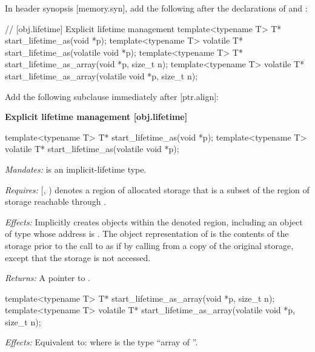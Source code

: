 In header  synopsis [memory.syn], add the following after the declarations of  and :

\begin{adjustwidth}{0.5cm}{0.5cm}

\begin{addedblock}
\begin{codeblock}
// [obj.lifetime] Explicit lifetime management
template<typename T> T* start_lifetime_as(void *p);
template<typename T> volatile T* start_lifetime_as(volatile void *p);
template<typename T> T* start_lifetime_as_array(void *p, size_t n);
template<typename T> volatile T* start_lifetime_as_array(volatile void *p, size_t n);
\end{codeblock}
\end{addedblock}
\end{adjustwidth}

Add the following subclause immediately after [ptr.align]:

\begin{addedblock}
\textbf{Explicit lifetime management \hspace{83mm}[obj.lifetime]}

\begin{codeblock}
template<typename T> T* start_lifetime_as(void *p);
template<typename T> volatile T* start_lifetime_as(volatile void *p);
\end{codeblock}

\begin{adjustwidth}{0.5cm}{0.5cm}
\emph{Mandates:}  is an implicit-lifetime type.

\emph{Requires:} [, ) denotes a region of allocated storage that is a subset of the region of storage reachable through .

\emph{Effects:} Implicitly creates objects within the denoted region,
including an object  of type  whose address is . The object
representation of  is the contents of the storage prior to the
call to  as if by calling  from a copy of the
original storage, except that the storage is not accessed.

\emph{Returns:} A pointer to .
\end{adjustwidth}

\begin{codeblock}
template<typename T> T* start_lifetime_as_array(void *p, size_t n);
template<typename T> volatile T* start_lifetime_as_array(volatile void *p, size_t n);
\end{codeblock}

\begin{adjustwidth}{0.5cm}{0.5cm}
\emph{Effects:} Equivalent to:  where  is the type ``array of  ''.
\end{adjustwidth}

\end{addedblock}

